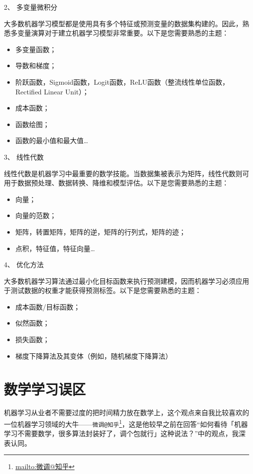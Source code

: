 \documentclass[]{ctexbook}
\renewcommand{\href}[2]{#2\footnote{\url{#1}}}
\begin{document}
2、 多变量微积分

大多数机器学习模型都是使用具有多个特征或预测变量的数据集构建的。因此，熟悉多变量演算对于建立机器学习模型非常重要。以下是您需要熟悉的主题：

\begin{itemize}
\item
  多变量函数；
\item
  导数和梯度；
\item
  阶跃函数，Sigmoid函数，Logit函数，ReLU函数（整流线性单位函数，Rectified Linear Unit）；
\item
  成本函数；
\item
  函数绘图；
\item
  函数的最小值和最大值\ldots{}
\end{itemize}

3、 线性代数

线性代数是机器学习中最重要的数学技能。当数据集被表示为矩阵，线性代数则可用于数据预处理、数据转换、降维和模型评估。以下是您需要熟悉的主题：

\begin{itemize}
\item
  向量；
\item
  向量的范数；
\item
  矩阵，转置矩阵，矩阵的逆，矩阵的行列式，矩阵的迹；
\item
  点积，特征值，特征向量\ldots{}
\end{itemize}

4、 优化方法

大多数机器学习算法通过最小化目标函数来执行预测建模，因而机器学习必须应用于测试数据的权重才能获得预测标签。以下是您需要熟悉的主题：

\begin{itemize}
\item
  成本函数/目标函数；
\item
  似然函数；
\item
  损失函数；
\item
  梯度下降算法及其变体（例如，随机梯度下降算法）
\end{itemize}

\hypertarget{ux6570ux5b66ux5b66ux4e60ux8befux533a}{%
\section{数学学习误区}\label{ux6570ux5b66ux5b66ux4e60ux8befux533a}}

机器学习从业者不需要过度的把时间精力放在数学上，这个观点来自我比较喜欢的一位机器学习领域的大牛------\href{mailto:微调@知乎}{\nolinkurl{微调@知乎}}，这是他较早之前在回答``如何看待「机器学习不需要数学，很多算法封装好了，调个包就行」这种说法？''中的观点，我深表认同。
\end{document}
